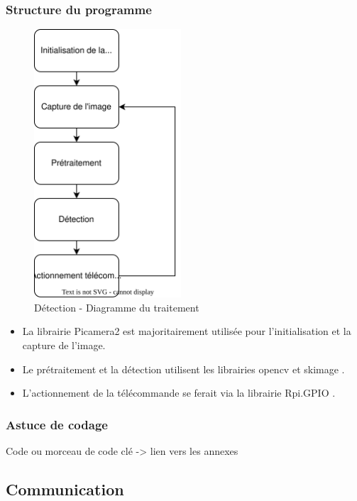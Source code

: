 \subsubsection{Structure du programme}
\begin{figure}[H]
    \centering
    \includegraphics[height=10cm]{assets/figures/diagramme_traitement.svg}
    \caption{Détection - Diagramme du traitement}
\end{figure}
\begin{itemize}
    \item La librairie Picamera2 \cite{picamera2} est majoritairement utilisée pour l'initialisation et la capture de l'image.
    \item Le prétraitement et la détection utilisent les librairies opencv \cite{opencv} et skimage \cite{skimage}.
    \item L'actionnement de la télécommande se ferait via la librairie Rpi.GPIO \cite{rpio}.
\end{itemize}
\subsubsection{Astuce de codage}
Code ou morceau de code clé -> lien vers les annexes
\subsection{Communication}
